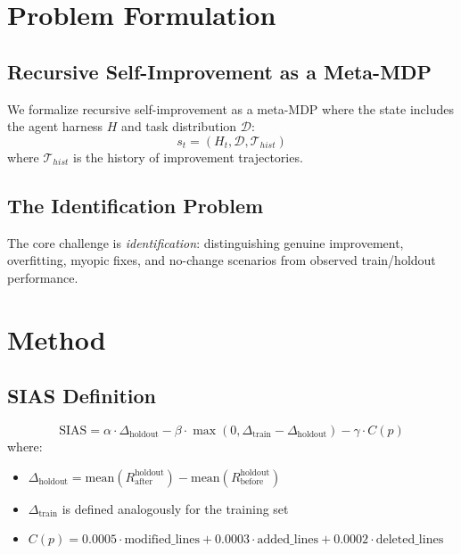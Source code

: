 \documentclass{article}
\begin{document}
\section{Problem Formulation}
\label{sec:formulation}

\subsection{Recursive Self-Improvement as a Meta-MDP}
We formalize recursive self-improvement as a meta-MDP where the state includes the agent harness $H$ and task distribution $\mathcal{D}$:
\begin{equation}
    s_t = (H_t, \mathcal{D}, \mathcal{T}_{hist})
\end{equation}
where $\mathcal{T}_{hist}$ is the history of improvement trajectories.

\subsection{The Identification Problem}
The core challenge is \emph{identification}: distinguishing genuine improvement, overfitting, myopic fixes, and no-change scenarios from observed train/holdout performance.

\section{Method}
\label{sec:method}

\subsection{SIAS Definition}
\begin{equation}
    \text{SIAS} = \alpha \cdot \Delta_{\text{holdout}} - \beta \cdot \max(0, \Delta_{\text{train}} - \Delta_{\text{holdout}}) - \gamma \cdot C(p)
    \label{eq:sias}
\end{equation}
where:
\begin{itemize}
    \item $\Delta_{\text{holdout}} = \text{mean}(R_{\text{after}}^{\text{holdout}}) - \text{mean}(R_{\text{before}}^{\text{holdout}})$
    \item $\Delta_{\text{train}}$ is defined analogously for the training set
    \item $C(p) = 0.0005 \cdot \text{modified\_lines} + 0.0003 \cdot \text{added\_lines} + 0.0002 \cdot \text{deleted\_lines}$
\end{itemize}
\end{document}
